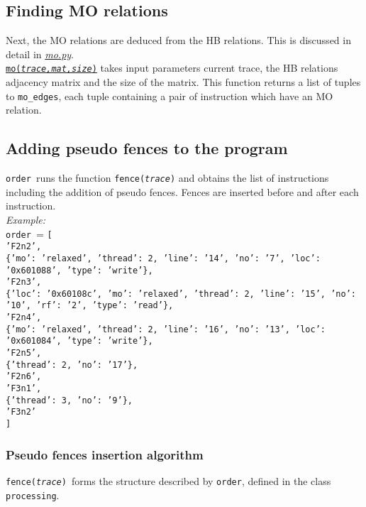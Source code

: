 \documentclass{article}
\newcommand{\var}[1]{\color{OliveGreen} \texttt{#1}\color{black}}
\newcommand{\fun}[2]{\color{Sepia}\texttt{#1(\color{Gray}\textit{#2}\color{Sepia})}\color{black}}
\newcommand{\varinfo}[1]{\scriptsize \texttt{#1} \normalsize}
\newcommand{\class}[1]{\color{DarkOrchid}\texttt{#1}\color{black}}
\begin{document}
\subsection{Finding MO relations}
Next, the MO relations are deduced from the HB relations. This is discussed in detail in \href{mo.tex}{\textit{mo.py}}.\\
\href{mo.tex}{\fun{mo}{trace,mat,size}} takes input parameters current trace, the HB relations adjacency matrix and the size of the matrix. This function returns a list of tuples to \var{mo\_edges}, each tuple containing a pair of instruction which have an MO relation.

\subsection{Adding pseudo fences to the program}
\var{order }runs the function \fun{fence}{trace} and obtains the list of instructions including the addition of pseudo fences. Fences are inserted before and after each instruction.\\
\textit{Example:}\\
\var{order }= \varinfo{[\\
'F2n2', \\
\{'mo': 'relaxed', 'thread': 2, 'line': '14', 'no': '7', 'loc': '0x601088', 'type': 'write'\},\\ 
'F2n3', \\
\{'loc': '0x60108c', 'mo': 'relaxed', 'thread': 2, 'line': '15', 'no': '10', 'rf': '2', 'type': 'read'\}, \\
'F2n4', \\
\{'mo': 'relaxed', 'thread': 2, 'line': '16', 'no': '13', 'loc': '0x601084', 'type': 'write'\}, \\
'F2n5', \\
\{'thread': 2, 'no': '17'\}, \\
'F2n6', \\
'F3n1', \\
\{'thread': 3, 'no': '9'\}, \\
'F3n2'\\
]}
\subsubsection{Pseudo fences insertion algorithm}
\fun{fence}{trace}\ forms the structure described by \var{order}, defined in the class \class{processing}.\\
\end{document}
